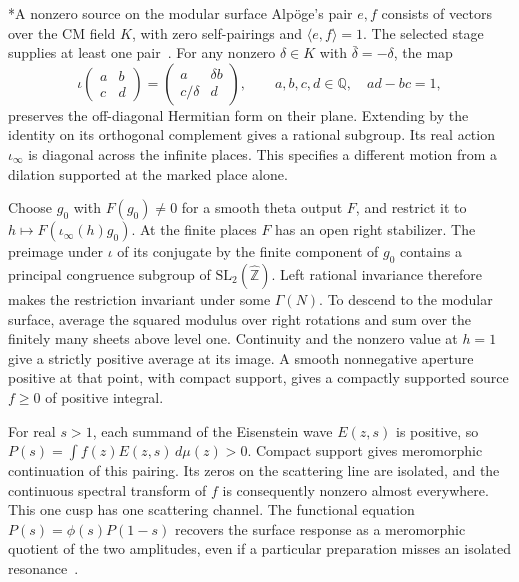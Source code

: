 \documentclass[11pt,letterpaper]{article}
\makeatletter
\renewcommand\subsection{\@startsection{subsection}{2}{\z@}{-2.0ex plus -.3ex}{.75ex}{\normalfont\normalsize\itshape}}
\numberwithin{equation}{section}
\makeatother
\begin{document}
\subsection*{A nonzero source on the modular surface}\label{app:modular-source}
Alp\"oge's pair $e,f$ consists of vectors over the CM field $K$, with zero self-pairings and $\langle e,f\rangle=1$. The selected stage supplies at least one pair~\cite{thetaoriginal,shearjoin}. For any nonzero $\delta\in K$ with $\bar\delta=-\delta$, the map
\[
  \iota\!\begin{pmatrix}a&b\\c&d\end{pmatrix}
   =\begin{pmatrix}a&\delta b\\c/\delta&d\end{pmatrix},
   \qquad a,b,c,d\in\mathbb Q,\quad ad-bc=1,
\]
preserves the off-diagonal Hermitian form on their plane. Extending by the identity on its orthogonal complement gives a rational subgroup. Its real action $\iota_\infty$ is diagonal across the infinite places. This specifies a different motion from a dilation supported at the marked place alone.

Choose $g_0$ with $F(g_0)\ne0$ for a smooth theta output $F$, and restrict it to $h\mapsto F(\iota_\infty(h)g_0)$. At the finite places $F$ has an open right stabilizer. The preimage under $\iota$ of its conjugate by the finite component of $g_0$ contains a principal congruence subgroup of $\mathrm{SL}_2(\widehat{\mathbb Z})$. Left rational invariance therefore makes the restriction invariant under some $\Gamma(N)$. To descend to the modular surface, average the squared modulus over right rotations and sum over the finitely many sheets above level one. Continuity and the nonzero value at $h=1$ give a strictly positive average at its image. A smooth nonnegative aperture positive at that point, with compact support, gives a compactly supported source $f\ge0$ of positive integral.

For real $s>1$, each summand of the Eisenstein wave $E(z,s)$ is positive, so $P(s)=\int f(z)E(z,s)\,d\mu(z)>0$. Compact support gives meromorphic continuation of this pairing. Its zeros on the scattering line are isolated, and the continuous spectral transform of $f$ is consequently nonzero almost everywhere. This one cusp has one scattering channel. The functional equation $P(s)=\phi(s)P(1-s)$ recovers the surface response as a meromorphic quotient of the two amplitudes, even if a particular preparation misses an isolated resonance~\cite{muellerspec}.
\end{document}

